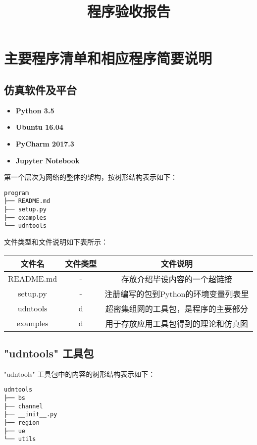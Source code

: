 \documentclass[11pt]{article}
\title{程序验收报告}
\providecommand{\tightlist}{%
      \setlength{\itemsep}{0pt}\setlength{\parskip}{0pt}}
\begin{document}
\maketitle

\section{主要程序清单和相应程序简要说明}\label{ux4e3bux8981ux7a0bux5e8fux6e05ux5355ux548cux76f8ux5e94ux7a0bux5e8fux7b80ux8981ux8bf4ux660e}

\subsection{仿真软件及平台}\label{udntools-ux5de5ux5177ux5305}
\begin{itemize}
\tightlist
\item
  \textbf{Python 3.5}
\item
  \textbf{Ubuntu 16.04}
\item
  \textbf{PyCharm 2017.3}
\item
  \textbf{Jupyter Notebook}
\end{itemize}

第一个层次为网络的整体的架构，按树形结构表示如下：

\begin{verbatim}
program
├── README.md
├── setup.py
├── examples
└── udntools
\end{verbatim}

文件类型和文件说明如下表所示：

\begin{longtable}[c]{@{}ccc@{}}
\toprule
文件名 & 文件类型 & 文件说明\tabularnewline
\midrule
\endhead
README.md & - & 存放介绍毕设内容的一个超链接\tabularnewline
setup.py & - & 注册编写的包到Python的环境变量列表里\tabularnewline
udntools & d & 超密集组网的工具包，是程序的主要部分\tabularnewline
examples & d & 用于存放应用工具包得到的理论和仿真图\tabularnewline
\bottomrule
\end{longtable}

    \subsection{"udntools" 工具包}\label{udntools-ux5de5ux5177ux5305}

"udntools" 工具包中的内容的树形结构表示如下：

\begin{verbatim}
udntools
├── bs
├── channel
├── __init__.py
├── region
├── ue
└── utils
\end{verbatim}
\end{document}
